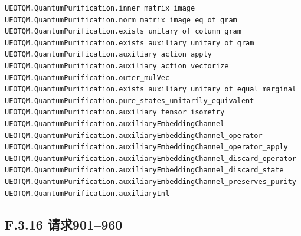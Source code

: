\documentclass[
  11pt,
  oneside]{book}
\begin{document}
\begin{Verbatim}[breaklines,breakanywhere,fontsize=\scriptsize]
UEOTQM.QuantumPurification.inner_matrix_image
UEOTQM.QuantumPurification.norm_matrix_image_eq_of_gram
UEOTQM.QuantumPurification.exists_unitary_of_column_gram
UEOTQM.QuantumPurification.exists_auxiliary_unitary_of_gram
UEOTQM.QuantumPurification.auxiliary_action_apply
UEOTQM.QuantumPurification.auxiliary_action_vectorize
UEOTQM.QuantumPurification.outer_mulVec
UEOTQM.QuantumPurification.exists_auxiliary_unitary_of_equal_marginal
UEOTQM.QuantumPurification.pure_states_unitarily_equivalent
UEOTQM.QuantumPurification.auxiliary_tensor_isometry
UEOTQM.QuantumPurification.auxiliaryEmbeddingChannel
UEOTQM.QuantumPurification.auxiliaryEmbeddingChannel_operator
UEOTQM.QuantumPurification.auxiliaryEmbeddingChannel_operator_apply
UEOTQM.QuantumPurification.auxiliaryEmbeddingChannel_discard_operator
UEOTQM.QuantumPurification.auxiliaryEmbeddingChannel_discard_state
UEOTQM.QuantumPurification.auxiliaryEmbeddingChannel_preserves_purity
UEOTQM.QuantumPurification.auxiliaryInl
\end{Verbatim}

\hypertarget{f.3.16-ux8bf7ux6c42901960}{%
\subsection{F.3.16 请求901--960}\label{f.3.16-ux8bf7ux6c42901960}}
\end{document}
